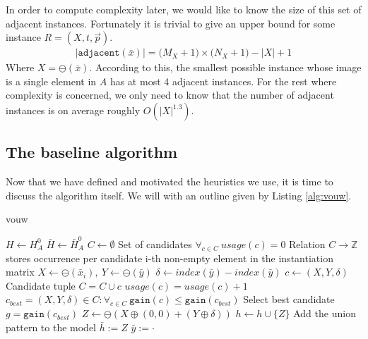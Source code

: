 \documentclass{llncs}
\begin{document}
In order to compute complexity later, we would like to know the size of this set of adjacent instances. Fortunately it is trivial to give an upper bound for some instance $R=(X,t,\vec{p})$.
\begin{align}
	|\mathtt{adjacent}(\bar{x})| = \big(M_X+1\big) \times \big(N_X+1\big) - |X| + 1
\end{align}
Where $X=\ominus(\bar{x})$. According to this, the smallest possible instance whose image is a single element in $A$ has at most 4 adjacent instances. For the rest where complexity is concerned, we only need to know that the number of adjacent instances is on average roughly $O(|X|^{1.3})$.

\subsection{The baseline algorithm}

Now that we have defined and motivated the heuristics we use, it is time to discuss the algorithm itself. We will with an outline given by Listing \ref{alg:vouw}.

\begin{algorithm}
\caption{vouw}
\label{alg:vouw}
\begin{algorithmic}
\State $H \gets H_A^0$
\State $\bar{H} \gets \bar{H}_A^0$
\Repeat
	\State $C \gets \emptyset$ 
		\Comment Set of candidates
	\State $\forall_{c\in C} \ {usage}(c) = 0$
		\Comment Relation $C \to \mathbb{Z}$ stores occurrence per candidate
		\Comment i-th non-empty element in the instantiation matrix
		\State $X \gets \ominus(\bar{x}_i), \ Y \gets \ominus(\bar{y})$
		\State $\delta \gets {index}(\bar{y}) - {index}(\bar{y})$
		\State $c \gets (X,Y,\delta)$
			\Comment Candidate tuple
		\State $C = C \cup c$
		\State ${usage}(c) = {usage}(c) + 1$ 
		\EndFor
	\EndFor	
	\State $c_{best} = (X,Y,\delta) \in C : \forall_{c \in C} \ \mathtt{gain}(c) \leq \mathtt{gain}(c_{best})$
		\Comment Select best candidate
	\State $g = \mathtt{gain}(c_{best})$
		\State $Z \gets \ominus(X\oplus(0,0) + (Y\oplus\delta))$
		\State $h \gets h \cup \{Z\}$
			\Comment Add the union pattern to the model
				\State $\bar{h} := Z$
				\State $\bar{y} := \cdot$
			\EndFor
		\EndFor
	\EndIf
{}

\end{algorithmic}
\end{algorithm} 
\end{document}
